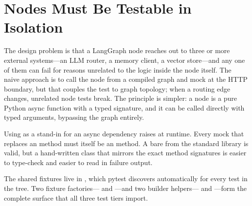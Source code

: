 \section{Nodes Must Be Testable in Isolation}
\label{sec:unit-isolation}

The design problem is that a LangGraph node reaches out to three or more
external systems---an LLM router, a memory client, a vector store---and
any one of them can fail for reasons unrelated to the logic inside the
node itself.
The naive approach is to call the node from a compiled graph and mock at
the HTTP boundary, but that couples the test to graph topology; when a
routing edge changes, unrelated node tests break.
The principle is simpler: a node is a pure Python async function with a
typed signature, and it can be called directly with typed arguments,
bypassing the graph entirely.

\begin{warningbox}
Using  as a stand-in for an async
dependency raises  at runtime.
Every mock that replaces an  method must itself be an
 method.
A bare  from the standard library is
valid, but a hand-written class that mirrors the exact method signatures
is easier to type-check and easier to read in failure output.
\end{warningbox}

The shared fixtures live in , which pytest
discovers automatically for every test in the  tree.
Two fixture factories--- and ---and two
builder helpers--- and ---form the
complete surface that all three test tiers import.


